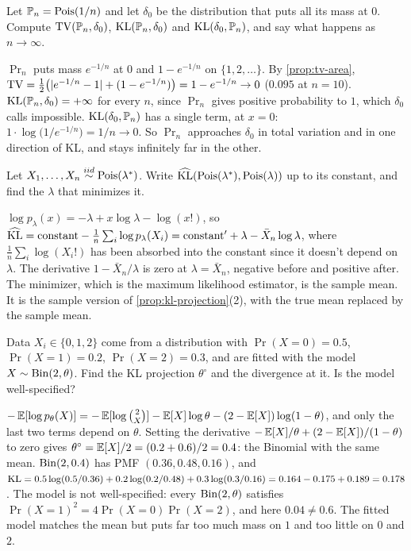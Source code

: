 \begin{exercise}
\label{ex:dist-pois-dirac}
Let $\mathbb{P}_n = \text{Pois}(1/n)$ and let $\delta_0$ be the distribution that puts all its mass at $0$. Compute $\mathrm{TV}(\mathbb{P}_n, \delta_0)$, $\mathrm{KL}(\mathbb{P}_n, \delta_0)$ and $\mathrm{KL}(\delta_0, \mathbb{P}_n)$, and say what happens as $n \to \infty$.
\end{exercise}
\begin{solution}
$\Pr_n$ puts mass $e^{-1/n}$ at $0$ and $1 - e^{-1/n}$ on $\{1, 2, \ldots\}$. By \cref{prop:tv-area}, $\mathrm{TV} = \frac12\big(\lvert e^{-1/n} - 1\rvert + (1 - e^{-1/n})\big) = 1 - e^{-1/n} \to 0$ ($0.095$ at $n = 10$). $\mathrm{KL}(\mathbb{P}_n, \delta_0) = +\infty$ for every $n$, since $\Pr_n$ gives positive probability to $1$, which $\delta_0$ calls impossible. $\mathrm{KL}(\delta_0, \mathbb{P}_n)$ has a single term, at $x = 0$: $1 \cdot \log\big(1/e^{-1/n}\big) = 1/n \to 0$. So $\Pr_n$ approaches $\delta_0$ in total variation and in one direction of KL, and stays infinitely far in the other.
\end{solution}

\begin{exercise}
\label{ex:dist-kl-mle-poisson}
Let $X_1, \ldots, X_n \stackrel{iid}{\sim} \text{Pois}(\lambda^*)$. Write $\widehat{\mathrm{KL}}(\text{Pois}(\lambda^*), \text{Pois}(\lambda))$ up to its constant, and find the $\lambda$ that minimizes it.
\end{exercise}
\begin{solution}
$\log p_\lambda(x) = -\lambda + x\log\lambda - \log(x!)$, so $\widehat{\mathrm{KL}} = \text{constant} - \frac1n\sum_i \log p_\lambda(X_i) = \text{constant}' + \lambda - \bar{X}_n\log\lambda$, where $\frac1n\sum_i\log(X_i!)$ has been absorbed into the constant since it doesn't depend on $\lambda$. The derivative $1 - \bar{X}_n/\lambda$ is zero at $\lambda = \bar{X}_n$, negative before and positive after. The minimizer, which is the maximum likelihood estimator, is the sample mean. It is the sample version of \cref{prop:kl-projection}(2), with the true mean replaced by the sample mean.
\end{solution}

\begin{exercise}
\label{ex:dist-projection-bin}
Data $X_i \in \{0, 1, 2\}$ come from a distribution with $\Pr(X = 0) = 0.5$, $\Pr(X = 1) = 0.2$, $\Pr(X = 2) = 0.3$, and are fitted with the model $X \sim \mathrm{Bin}(2, \theta)$. Find the KL projection $\theta^\circ$ and the divergence at it. Is the model well-specified?
\end{exercise}
\begin{solution}
$-\operatorname*{\mathbb{E}}[\log p_\theta(X)] = -\operatorname*{\mathbb{E}}[\log\binom{2}{X}] - \operatorname*{\mathbb{E}}[X]\log\theta - (2 - \operatorname*{\mathbb{E}}[X])\log(1 - \theta)$, and only the last two terms depend on $\theta$. Setting the derivative $-\operatorname*{\mathbb{E}}[X]/\theta + (2 - \operatorname*{\mathbb{E}}[X])/(1 - \theta)$ to zero gives $\theta^\circ = \operatorname*{\mathbb{E}}[X]/2 = (0.2 + 0.6)/2 = 0.4$: the Binomial with the same mean. $\mathrm{Bin}(2, 0.4)$ has PMF $(0.36, 0.48, 0.16)$, and $\mathrm{KL} = 0.5\log(0.5/0.36) + 0.2\log(0.2/0.48) + 0.3\log(0.3/0.16) = 0.164 - 0.175 + 0.189 = 0.178$. The model is not well-specified: every $\mathrm{Bin}(2, \theta)$ satisfies $\Pr(X = 1)^2 = 4\Pr(X = 0)\Pr(X = 2)$, and here $0.04 \neq 0.6$. The fitted model matches the mean but puts far too much mass on $1$ and too little on $0$ and $2$.
\end{solution}
